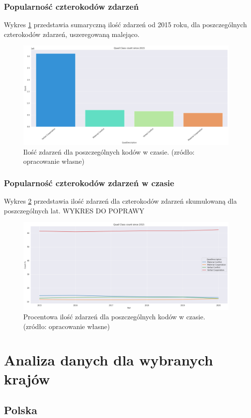 \documentclass[11pt]{report}
\begin{document}
 \subsection{Popularność czterokodów zdarzeń}
  	Wykres \ref{fig:GLOBALQC} przedstawia sumaryczną ilość zdarzeń od 2015 roku, dla poszczególnych czterokodów zdarzeń, uszeregowaną malejąco.
  	\begin{figure}[ht]
	\centering
	\includegraphics[width=0.8 \textwidth]{fig/GLOBAL/QC.png}
	\caption{Ilość zdarzeń dla poszczególnych kodów w czasie. (zródło: opracowanie własne)}
	\label{fig:GLOBALQC}
	\end{figure}
	
 \subsection{Popularność czterokodów zdarzeń w czasie}
  Wykres \ref{fig:GLOBALQCperc} przedstawia ilość zdarzeń dla czterokodów zdarzeń skumulowaną dla poszczególnych lat.
   WYKRES DO POPRAWY
    \begin{figure}[ht]
	\centering
	\includegraphics[width=0.8 \textwidth]{fig/GLOBAL/QCperc.png}
	\caption{Procentowa ilość zdarzeń dla poszczególnych kodów w czasie. (zródło: opracowanie własne)}
	\label{fig:GLOBALQCperc}
	\end{figure}

 
 \chapter{Analiza danych dla wybranych krajów}
 \section{Polska}
 
\end{document}
